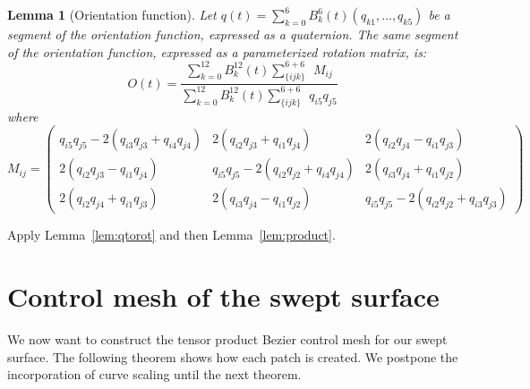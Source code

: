 \documentclass[times]{article}
\newcommand{\QED}{\vrule height 1.4ex width 1.0ex depth -.1ex\ } %
\newcommand{\prf}{\noindent{{\bf Proof} :\ }}
\newtheorem{lemma}{Lemma}[section]
\begin{document}
\begin{lemma}[Orientation function]
\label{lem:Mij}
Let $q(t) = \sum_{k=0}^6 B_k^6(t) (q_{k1},\ldots,q_{k5})$
be a segment of the orientation function, expressed as a quaternion.
The same segment of the orientation function, expressed as a parameterized
rotation matrix, is:
\begin{equation}
\label{eq:Ot}
O(t) = \frac{\sum_{k=0}^{12} B_k^{12}(t) \sum_{\{ijk\}}^{6+6}\ \ M_{ij}}
	    {\sum_{k=0}^{12} B_k^{12}(t) \sum_{\{ijk\}}^{6+6} \ \ q_{i5}q_{j5}}
\end{equation}
where
\[
	M_{ij} = \left( \begin{array}{ccc}
	q_{i5}q_{j5} - 2(q_{i3}q_{j3} + q_{i4}q_{j4}) &
	2(q_{i2}q_{j3} + q_{i1}q_{j4}) &
	2(q_{i2}q_{j4} - q_{i1}q_{j3}) \\
	2(q_{i2}q_{j3} - q_{i1}q_{j4}) &
	q_{i5}q_{j5} - 2(q_{i2}q_{j2} + q_{i4}q_{j4}) &
	2(q_{i3}q_{j4} + q_{i1}q_{j2}) \\
	2(q_{i2}q_{j4} + q_{i1}q_{j3}) &
	2(q_{i3}q_{j4} - q_{i1}q_{j2}) &
	q_{i5}q_{j5} - 2(q_{i2}q_{j2} + q_{i3}q_{j3}) 
	\end{array} \right)
\]
\end{lemma}
\prf
Apply Lemma~\ref{lem:qtorot} and then Lemma~\ref{lem:product}.
\QED

\section{Control mesh of the swept surface}
\label{sec:mesh}

We now want to construct the tensor product Bezier control mesh 
for our swept surface.
The following theorem shows how each patch is created.
We postpone the incorporation of curve scaling until the next theorem.
\end{document}
